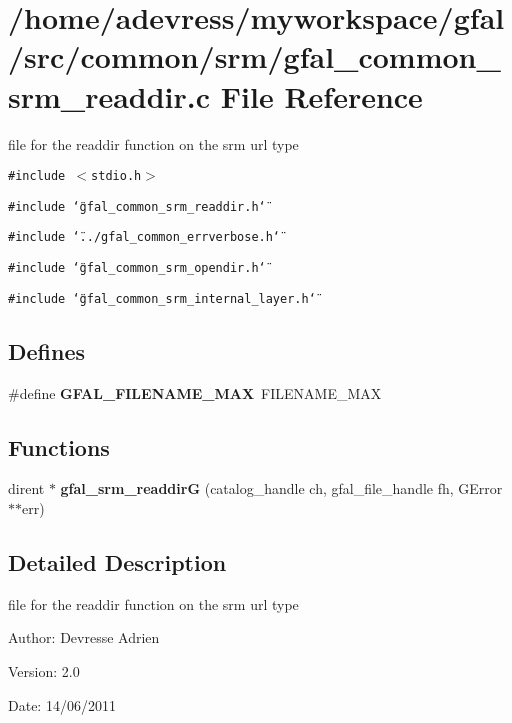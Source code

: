 \section{/home/adevress/myworkspace/gfal/src/common/srm/gfal\_\-common\_\-srm\_\-readdir.c File Reference}
\label{gfal__common__srm__readdir_8c}
file for the readdir function on the srm url type 

{\tt \#include $<$stdio.h$>$}\par
{\tt \#include \char`\"{}gfal\_\-common\_\-srm\_\-readdir.h\char`\"{}}\par
{\tt \#include \char`\"{}../gfal\_\-common\_\-errverbose.h\char`\"{}}\par
{\tt \#include \char`\"{}gfal\_\-common\_\-srm\_\-opendir.h\char`\"{}}\par
{\tt \#include \char`\"{}gfal\_\-common\_\-srm\_\-internal\_\-layer.h\char`\"{}}\par
\subsection*{Defines}
\begin{CompactItemize}
\item 
\#define \textbf{GFAL\_\-FILENAME\_\-MAX}~FILENAME\_\-MAX\label{gfal__common__srm__readdir_8c_595a5b00305895e25ce0e00b177fd8a8}

\end{CompactItemize}
\subsection*{Functions}
\begin{CompactItemize}
\item 
dirent $\ast$ \textbf{gfal\_\-srm\_\-readdir\-G} (catalog\_\-handle ch, gfal\_\-file\_\-handle fh, GError $\ast$$\ast$err)\label{gfal__common__srm__readdir_8c_fbf0023f141e4c099c13cbc506bdf2dd}

\end{CompactItemize}


\subsection{Detailed Description}
file for the readdir function on the srm url type 

\begin{Desc}
\item[Author:]Devresse Adrien \end{Desc}
\begin{Desc}
\item[Version:]2.0 \end{Desc}
\begin{Desc}
\item[Date:]14/06/2011 \end{Desc}
